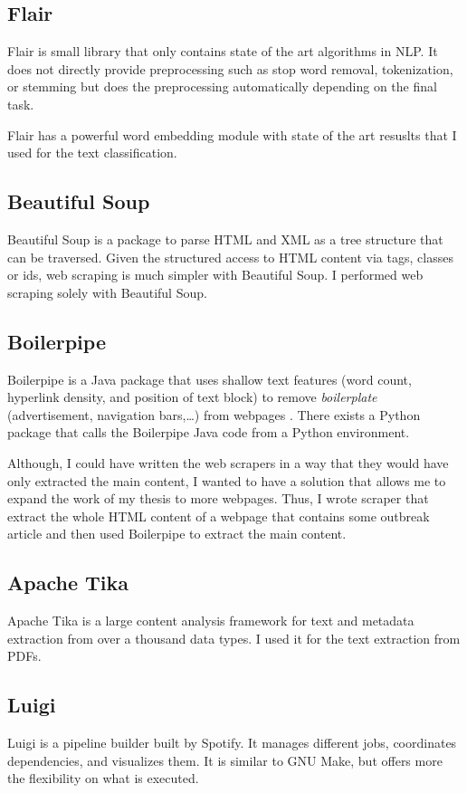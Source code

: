 \subsection{Flair}
Flair is small library that only contains state of the art algorithms in NLP. It does not directly provide preprocessing such as stop word removal, tokenization, or stemming but does the preprocessing automatically depending on the final task.

Flair has a powerful word embedding module with state of the art resuslts that I used for the text classification.

\subsection{Beautiful Soup}
Beautiful Soup is a package to parse HTML and XML as a tree structure that can be traversed. Given the structured access to HTML content via tags, classes or ids, web scraping is much simpler with Beautiful Soup.
I performed web scraping solely with Beautiful Soup.

\subsection{Boilerpipe}
Boilerpipe is a Java package that uses shallow text features (word count, hyperlink density, and position of text block) to remove \textsl{boilerplate} (advertisement, navigation bars,\dots) from webpages \citep{Kohlschutter2010}. There exists a Python package that calls the Boilerpipe Java code from a Python environment.

Although, I could have written the web scrapers in a way that they would have only extracted the main content, I wanted to have a solution that allows me to expand the work of my thesis to more webpages. Thus, I wrote scraper that extract the whole HTML content of a webpage that contains some outbreak article and then used Boilerpipe to extract the main content.

\subsection{Apache Tika}
Apache Tika is a large content analysis framework for text and metadata extraction from over a thousand data types. I used it for the text extraction from PDFs.

\subsection{Luigi}
Luigi is a pipeline builder built by Spotify. It manages different jobs, coordinates dependencies, and visualizes them. It is similar to GNU Make, but offers more the flexibility on what is executed.

